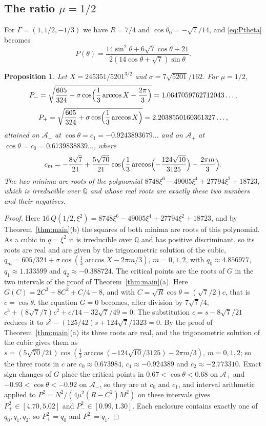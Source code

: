 \documentclass[11pt]{article}
\newtheorem{proposition}{Proposition}
\theoremstyle{definition}
\newcommand{\Q}{\mathbb{Q}}
\newcommand{\Ap}{\mathcal{A}_+}
\newcommand{\Am}{\mathcal{A}_-}
\begin{document}
\subsection{The ratio \texorpdfstring{$\mu = 1/2$}{mu = 1/2}}

For $\Gamma = (1, 1/2, -1/3)$ we have $R = 7/4$ and $\cos\theta_0 = -\sqrt{7}/14$, and \eqref{eq:Ptheta} becomes
\[
  P(\theta) = \frac{14\sin^2\theta + 6\sqrt{7}\cos\theta + 21}{2(14\cos\theta + \sqrt{7})\sin\theta}.
\]

\begin{proposition}\label{prop:half}
Let $X = 245351/5201^{3/2}$ and $\sigma = 7\sqrt{5201}/162$. For $\mu = 1/2$,
\[
  P_- = \sqrt{\frac{605}{324} + \sigma\cos\Bigl(\frac13 \arccos X - \frac{2\pi}{3}\Bigr)} = 1.0647059762712043\ldots,
\]
\[
  P_+ = \sqrt{\frac{605}{324} + \sigma\cos\Bigl(\frac13 \arccos X\Bigr)} = 2.2038550160361327\ldots,
\]
attained on $\Am$ at $\cos\theta = c_1 = -0.9243893679\ldots$ and on $\Ap$ at $\cos\theta = c_0 = 0.6739838839\ldots$, where
\[
  c_m = -\frac{8\sqrt{7}}{21} + \frac{5\sqrt{70}}{21}\cos\Bigl(\frac13 \arccos\Bigl(-\frac{124\sqrt{10}}{3125}\Bigr) - \frac{2\pi m}{3}\Bigr).
\]
The two minima are roots of the polynomial $8748\xi^6 - 49005\xi^4 + 27794\xi^2 + 18723$, which is irreducible over $\Q$ and whose real roots are exactly these two numbers and their negatives.
\end{proposition}

\begin{proof}
Here $16\,Q(1/2, \xi^2) = 8748\xi^6 - 49005\xi^4 + 27794\xi^2 + 18723$, and by Theorem~\ref{thm:main}(b) the squares of both minima are roots of this polynomial. As a cubic in $q = \xi^2$ it is irreducible over $\Q$ and has positive discriminant, so its roots are real and are given by the trigonometric solution of the cubic, $q_m = 605/324 + \sigma\cos(\frac13 \arccos X - 2\pi m/3)$, $m = 0, 1, 2$, with $q_0 \approx 4.856977$, $q_1 \approx 1.133599$ and $q_2 \approx -0.388724$. The critical points are the roots of $G$ in the two intervals of the proof of Theorem~\ref{thm:main}(a). Here $G(C) = 2C^3 + 8C^2 + C/4 - 8$, and with $C = \sqrt{R}\cos\theta = (\sqrt{7}/2)c$, that is $c = \cos\theta$, the equation $G = 0$ becomes, after division by $7\sqrt{7}/4$, $c^3 + (8\sqrt{7}/7)c^2 + c/14 - 32\sqrt{7}/49 = 0$. The substitution $c = s - 8\sqrt{7}/21$ reduces it to $s^3 - (125/42)s + 124\sqrt{7}/1323 = 0$. By the proof of Theorem~\ref{thm:main}(a) its three roots are real, and the trigonometric solution of the cubic gives them as $s = (5\sqrt{70}/21)\cos(\frac13\arccos(-124\sqrt{10}/3125) - 2\pi m/3)$, $m = 0, 1, 2$; so the three roots in $c$ are $c_0 \approx 0.673984$, $c_1 \approx -0.924389$ and $c_2 \approx -2.773310$. Exact sign changes of $G$ place the critical points in $0.67 < \cos\theta < 0.68$ on $\Ap$ and $-0.93 < \cos\theta < -0.92$ on $\Am$, so they are at $c_0$ and $c_1$, and interval arithmetic applied to $P^2 = N^2/(4\mu^2 (R - C^2) M^2)$ on these intervals gives $P_+^2 \in [4.70, 5.02]$ and $P_-^2 \in [0.99, 1.30]$. Each enclosure contains exactly one of $q_0, q_1, q_2$, so $P_+^2 = q_0$ and $P_-^2 = q_1$.
\end{proof}
\end{document}
